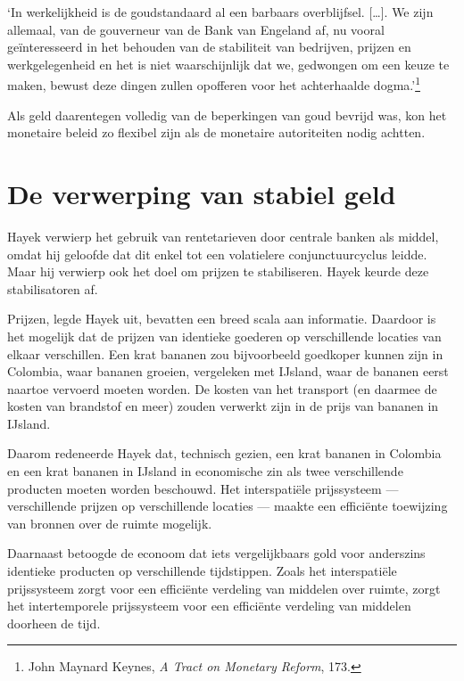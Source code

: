 \documentclass[
  a5paper,
  smalldemyvopaper,11pt,twoside,onecolumn,openright,extrafontsizes,
hidelinks]{memoir}
\renewenvironment{quote}%
               {\list{}{\rightmargin=.3cm\leftmargin=.3cm}%
                \itshape \item[]}%
               {\endlist}
\begin{document}
\begin{quote}
`In werkelijkheid is de goudstandaard al een barbaars overblijfsel.
{[}\ldots{]}. We zijn allemaal, van de gouverneur van de Bank van
Engeland af, nu vooral geïnteresseerd in het behouden van de stabiliteit
van bedrijven, prijzen en werkgelegenheid en het is niet waarschijnlijk
dat we, gedwongen om een keuze te maken, bewust deze dingen zullen
opofferen voor het achterhaalde dogma.'\footnote{\hspace{0pt}John
  Maynard Keynes, \emph{A Tract on Monetary Reform}, 173.}
\end{quote}

Als geld daarentegen volledig van de beperkingen van goud bevrijd was,
kon het monetaire beleid zo flexibel zijn als de monetaire autoriteiten
nodig achtten.

\section{De verwerping van stabiel
geld}\label{de-verwerping-van-stabiel-geld}

Hayek verwierp het gebruik van rentetarieven door centrale banken als
middel, omdat hij geloofde dat dit enkel tot een volatielere
conjunctuurcyclus leidde. Maar hij verwierp ook het doel om prijzen te
stabiliseren. Hayek keurde deze stabilisatoren af.

Prijzen, legde Hayek uit, bevatten een breed scala aan informatie.
Daardoor is het mogelijk dat de prijzen van identieke goederen op
verschillende locaties van elkaar verschillen. Een krat bananen zou
bijvoorbeeld goedkoper kunnen zijn in Colombia, waar bananen groeien,
vergeleken met IJsland, waar de bananen eerst naartoe vervoerd moeten
worden. De kosten van het transport (en daarmee de kosten van brandstof
en meer) zouden verwerkt zijn in de prijs van bananen in IJsland.

Daarom redeneerde Hayek dat, technisch gezien, een krat bananen in
Colombia en een krat bananen in IJsland in economische zin als twee
verschillende producten moeten worden beschouwd. Het interspatiële
prijssysteem --- verschillende prijzen op verschillende locaties ---
maakte een efficiënte toewijzing van bronnen over de ruimte mogelijk.

Daarnaast betoogde de econoom dat iets vergelijkbaars gold voor
anderszins identieke producten op verschillende tijdstippen. Zoals het
interspatiële prijssysteem zorgt voor een efficiënte verdeling van
middelen over ruimte, zorgt het intertemporele prijssysteem voor een
efficiënte verdeling van middelen doorheen de tijd.
\end{document}

